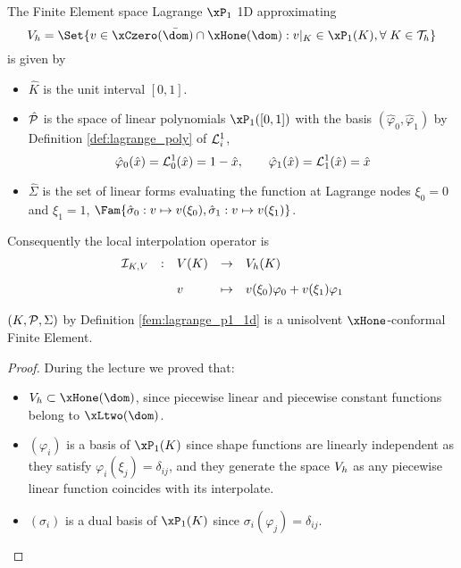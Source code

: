 \medskip
\begin{dfntn}\label{fem:lagrange_p1_1d}
The Finite Element space Lagrange $\xPone$ 1D approximating
\begin{equation*}
\xVh = \Set{ v \in \xCzero(\bar\dom)\cap\xHone(\dom) : v|_K \in\xP_1(K),\forany K \in\meshT }
\end{equation*}
is given by
\begin{itemize}
\item $\hat K$ is the unit interval $[0,1]$.
\item $\hat{{\mathcal P}}$ is the space of linear polynomials $\xPone([0,1])$ with the basis $(\hat\varphi_0, \hat\varphi_1)$ by Definition \ref{def:lagrange_poly} of $\mathcal L^{1}_{i}$,
\begin{equation*}
\hat\varphi_0(\hat x) = \mathcal L^{1}_{0}(\hat x) = 1 - \hat x, \qquad \hat\varphi_1(\hat x) = \mathcal L^{1}_{1}(\hat x) = \hat x
\end{equation*}
\item $\hat\Sigma$ is the set of linear forms evaluating the function at Lagrange nodes $\xi_0 = 0$ and $\xi_1 = 1$, $\Fam{\hat\sigma_0:v\mapsto v(\xi_0), \hat\sigma_1:v\mapsto v(\xi_1)}$.
\end{itemize}
\end{dfntn}

Consequently the local interpolation operator is
\begin{equation*}\label{fem:lagrange_local_interpolator}
\begin{array}{lclcl}
\mathop{\mathcal{I}_{K,{V}}} &:& {V}(K) &\rightarrow& {{V}}_h(K)\\[2ex]
           & & v   &\mapsto    & \displaystyle v(\xi_0) \varphi_0 + v(\xi_1) \varphi_1
\end{array}
\end{equation*}

\begin{prpstn}
${({K},{\mathcal P}, {\Sigma})}$ by Definition \ref{fem:lagrange_p1_1d} is a unisolvent $\xHone$-conformal Finite Element.
\end{prpstn}
\begin{proof}
During the lecture we proved that:
\begin{itemize}
\item $\xVh\subset\xHone(\dom)$, since piecewise linear and piecewise constant functions belong to $\xLtwo(\dom)$.
\item $(\varphi_i)$ is a basis of $\xPone(K)$ since shape functions are linearly independent as they satisfy $\varphi_i(\xi_j) = \delta_{ij}$, and they generate the space ${{V}}_h$ as any piecewise linear function coincides with its interpolate.
\item $(\sigma_i)$ is a dual basis of $\xPone(K)$ since $\sigma_i(\varphi_j) = \delta_{ij}$.
\end{itemize}
\end{proof}

